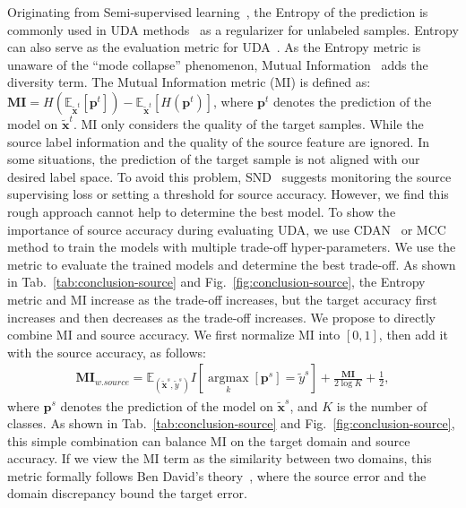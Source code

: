 \documentclass{article} %
\begin{document}
Originating from Semi-supervised learning~\cite{SSLEntropy}, the Entropy of the prediction is commonly used in UDA methods~\cite{ADVENT} as a regularizer for unlabeled samples. Entropy can also serve as the evaluation metric for UDA~\cite{C-Ent}. As the Entropy metric is unaware of the ``mode collapse'' phenomenon, Mutual Information~\cite{MI} adds the diversity term. The Mutual Information metric (MI) is defined as: 
$\boldsymbol{MI} = H(\mathbb{E}_{\tilde{\boldsymbol{x}}^t}[\boldsymbol{p}^t]) - \mathbb{E}_{\tilde{\boldsymbol{x}}^t}[H(\boldsymbol{p}^t)]$, where $\boldsymbol{p}^t$ denotes the prediction of the model on $\tilde{\boldsymbol{x}}^t$. MI only considers the quality of the target samples. While 
the source label information and the quality of the source feature are ignored. In some situations, the prediction of the target sample is not aligned with our desired label space. To avoid this problem, SND~\cite{SND} suggests monitoring the source supervising loss or setting a threshold for source accuracy. However, we find this rough approach cannot help to determine the best model. To show the importance of source accuracy during evaluating UDA, we use CDAN~\cite{CDAN} or MCC~\cite{MCC} method to train the models with multiple trade-off hyper-parameters. We use the metric to evaluate the trained models and determine the best trade-off. As shown in Tab.~\ref{tab:conclusion-source} and Fig.~\ref{fig:conclusion-source}, the Entropy metric and MI increase as the trade-off increases, but the target accuracy first increases and then decreases as the trade-off increases. 
We propose to directly combine MI and source accuracy. We first normalize MI into $[0,1]$, then add it with the source accuracy, as follows:
\begin{align}
\boldsymbol{MI}_{w. source} = \mathbb{E}_{(\tilde{\boldsymbol{x}}^s,\tilde y^s)} I[\underset{k}{\operatorname{argmax}}
[\boldsymbol{p}^s] = \tilde y^s]+\frac{\boldsymbol{MI}}{2\log K}+\frac{1}{2},
\end{align}
where $\boldsymbol{p}^s$ denotes the prediction of the model on $\tilde{\boldsymbol{x}}^s$, and $K$ is the number of classes. 
As shown in Tab.~\ref{tab:conclusion-source} and Fig.~\ref{fig:conclusion-source}, this simple combination can balance MI on the target domain and source accuracy. If we view the MI term as the similarity between two domains, this metric formally follows Ben David's theory~\cite{BenDavidA}, where the source error and the domain discrepancy bound the target error.
\end{document}
